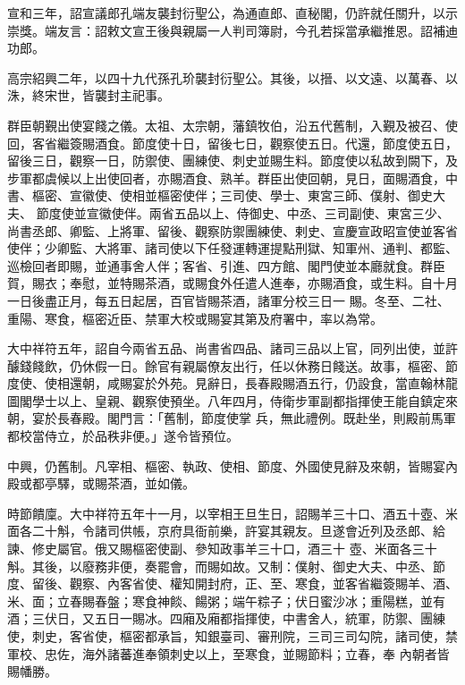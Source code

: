 \begin{pinyinscope}
 宣和三年，詔宣議郎孔端友襲封衍聖公，為通直郎、直秘閣，仍許就任關升，以示崇獎。端友言：詔敕文宣王後與親屬一人判司簿尉，今孔若採當承繼推恩。詔補迪功郎。



 高宗紹興二年，以四十九代孫孔玠襲封衍聖公。其後，以搢、以文遠、以萬春、以
 洙，終宋世，皆襲封主祀事。



 群臣朝覲出使宴餞之儀。太祖、太宗朝，藩鎮牧伯，沿五代舊制，入覲及被召、使回，客省繼簽賜酒食。節度使十日，留後七日，觀察使五日。代還，節度使五日，留後三日，觀察一日，防禦使、團練使、刺史並賜生料。節度使以私故到闕下，及步軍都虞候以上出使回者，亦賜酒食、熟羊。群臣出使回朝，見日，面賜酒食，中書、樞密、宣徽使、使相並樞密使伴；三司使、學士、東宮三師、僕射、御史大夫、
 節度使並宣徽使伴。兩省五品以上、侍御史、中丞、三司副使、東宮三少、尚書丞郎、卿監、上將軍、留後、觀察防禦團練使、剌史、宣慶宣政昭宣使並客省使伴；少卿監、大將軍、諸司使以下任發運轉運提點刑獄、知軍州、通判、都監、巡檢回者即賜，並通事舍人伴；客省、引進、四方館、閣門使並本廳就食。群臣賀，賜衣；奉慰，並特賜茶酒，或賜食外任遣人進奉，亦賜酒食，或生料。自十月一日後盡正月，每五日起居，百官皆賜茶酒，諸軍分校三日一
 賜。冬至、二社、重陽、寒食，樞密近臣、禁軍大校或賜宴其第及府署中，率以為常。



 大中祥符五年，詔自今兩省五品、尚書省四品、諸司三品以上官，同列出使，並許醵錢餞飲，仍休假一日。餘官有親屬僚友出行，任以休務日餞送。故事，樞密、節度使、使相還朝，咸賜宴於外苑。見辭日，長春殿賜酒五行，仍設食，當直翰林龍圖閣學士以上、皇親、觀察使預坐。八年四月，侍衛步軍副都指揮使王能自鎮定來朝，宴於長春殿。閣門言：「舊制，節度使掌
 兵，無此禮例。既赴坐，則殿前馬軍都校當侍立，於品秩非便。」遂令皆預位。



 中興，仍舊制。凡宰相、樞密、執政、使相、節度、外國使見辭及來朝，皆賜宴內殿或都亭驛，或賜茶酒，並如儀。



 時節饋廩。大中祥符五年十一月，以宰相王旦生日，詔賜羊三十口、酒五十壺、米面各二十斛，令諸司供帳，京府具衙前樂，許宴其親友。旦遂會近列及丞郎、給諫、修史屬官。俄又賜樞密使副、參知政事羊三十口，酒三十
 壺、米面各三十斛。其後，以廢務非便，奏罷會，而賜如故。又制：僕射、御史大夫、中丞、節度、留後、觀察、內客省使、權知開封府，正、至、寒食，並客省繼簽賜羊、酒、米、面；立春賜春盤；寒食神餤、餳粥；端午粽子；伏日蜜沙冰；重陽糕，並有酒；三伏日，又五日一賜冰。四廂及廂都指揮使，中書舍人，統軍，防禦、團練使，刺史，客省使，樞密都承旨，知銀臺司、審刑院，三司三司勾院，諸司使，禁軍校、忠佐，海外諸蕃進奉領刺史以上，至寒食，並賜節料；立春，奉
 內朝者皆賜幡勝。




\end{pinyinscope}
